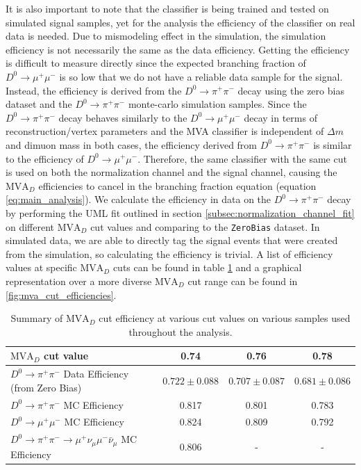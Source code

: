 It is also important to note that the classifier is being trained and tested on simulated signal samples, yet for the analysis the efficiency of the classifier on real data is needed. Due to mismodeling effect in the simulation, the simulation efficiency is not necessarily the same as the data efficiency. Getting the efficiency is difficult to measure directly since the expected branching fraction of $D^0 \to \mu^+ \mu^-$ is so low that we do not have a reliable data sample for the signal. Instead, the efficiency is derived from the $D^0 \to \pi^+ \pi^-$ decay using the zero bias dataset and the $D^0 \to \pi^+ \pi^-$ monte-carlo simulation samples. Since the $D^0 \to \pi^+ \pi^-$ decay behaves similarly to the $D^0 \to \mu^+ \mu^-$ decay in terms of reconstruction/vertex parameters and the MVA classifier is independent of $\Delta m$ and dimuon mass in both cases, the efficiency derived from $D^0 \to \pi^+ \pi^-$ is similar to the efficiency of $D^0 \to \mu^+ \mu^-$. Therefore, the same classifier with the same cut is used on both the normalization channel and the signal channel, causing the $\text{MVA}_D$ efficiencies to cancel in the branching fraction equation (equation \ref{eq:main_analysis}). We calculate the efficiency in data on the $D^0 \to \pi^+ \pi^-$ decay by performing the UML fit outlined in section \ref{subsec:normalization_channel_fit} on different $\text{MVA}_D$ cut values and comparing to the \texttt{ZeroBias} dataset. In simulated data, we are able to directly tag the signal events that were created from the simulation, so calculating the efficiency is trivial. A list of efficiency values at specific $\text{MVA}_D$ cuts can be found in table \ref{tab:mva_cut_efficiencies} and a graphical representation over a more diverse $\text{MVA}_D$ cut range can be found in \ref{fig:mva_cut_efficiencies}.

\begin{table}[htbp]
    \centering
    \begin{tabular}{|l|c|c|c|}
    \hline
    $\text{MVA}_D$ cut value & \textbf{0.74} & \textbf{0.76} & \textbf{0.78} \\
    \hline
    $D^0 \to \pi^+ \pi^-$ Data Efficiency (from Zero Bias) & $0.722 \pm 0.088$ & $0.707 \pm 0.087$ & $0.681 \pm 0.086$ \\
    $D^0 \to \pi^+ \pi^-$ MC Efficiency & 0.817 & 0.801 & 0.783 \\
    $D^0 \to \mu^+ \mu^-$ MC Efficiency & 0.824 & 0.809 & 0.792 \\
    $D^0 \to \pi^+ \pi^- \to \mu^+\nu_\mu\mu^-\bar{\nu}_\mu$ MC Efficiency & 0.806 & - & - \\
    \hline
    \end{tabular}
    \caption{Summary of $\text{MVA}_D$ cut efficiency at various cut values on various samples used throughout the analysis.}
    \label{tab:mva_cut_efficiencies}
\end{table}

